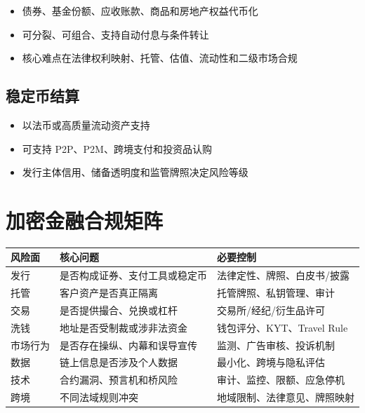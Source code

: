 \begin{itemize}
\tightlist
\item
  债券、基金份额、应收账款、商品和房地产权益代币化
\item
  可分裂、可组合、支持自动付息与条件转让
\item
  核心难点在法律权利映射、托管、估值、流动性和二级市场合规
\end{itemize}

\subsection{稳定币结算}\label{ux7a33ux5b9aux5e01ux7ed3ux7b97}

\begin{itemize}
\tightlist
\item
  以法币或高质量流动资产支持
\item
  可支持 P2P、P2M、跨境支付和投资品认购
\item
  发行主体信用、储备透明度和监管牌照决定风险等级
\end{itemize}

\section{加密金融合规矩阵}\label{ux52a0ux5bc6ux91d1ux878dux5408ux89c4ux77e9ux9635}

{\def\LTcaptype{none} %
\begin{longtable}[]{@{}lll@{}}
\toprule\noalign{}
风险面 & 核心问题 & 必要控制 \\
\midrule\noalign{}
\endhead
\bottomrule\noalign{}
\endlastfoot
发行 & 是否构成证券、支付工具或稳定币 & 法律定性、牌照、白皮书/披露 \\
托管 & 客户资产是否真正隔离 & 托管牌照、私钥管理、审计 \\
交易 & 是否提供撮合、兑换或杠杆 & 交易所/经纪/衍生品许可 \\
洗钱 & 地址是否受制裁或涉非法资金 & 钱包评分、KYT、Travel Rule \\
市场行为 & 是否存在操纵、内幕和误导宣传 & 监测、广告审核、投诉机制 \\
数据 & 链上信息是否涉及个人数据 & 最小化、跨境与隐私评估 \\
技术 & 合约漏洞、预言机和桥风险 & 审计、监控、限额、应急停机 \\
跨境 & 不同法域规则冲突 & 地域限制、法律意见、牌照映射 \\
\end{longtable}
}

